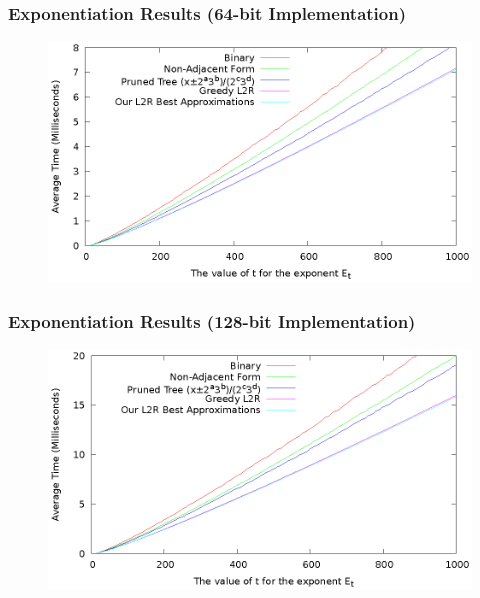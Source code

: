 \documentclass{beamer}
\begin{document}
\begin{frame}
\frametitle{Exponentiation Results (64-bit Implementation)}
\begin{figure}
\includegraphics[scale=0.86]{pow-winners-64}
\end{figure}
\end{frame}
\begin{frame}
\frametitle{Exponentiation Results (128-bit Implementation)}
\begin{figure}
\includegraphics[scale=0.86]{pow-winners-128}
\end{figure}
\end{frame}
\end{document}
